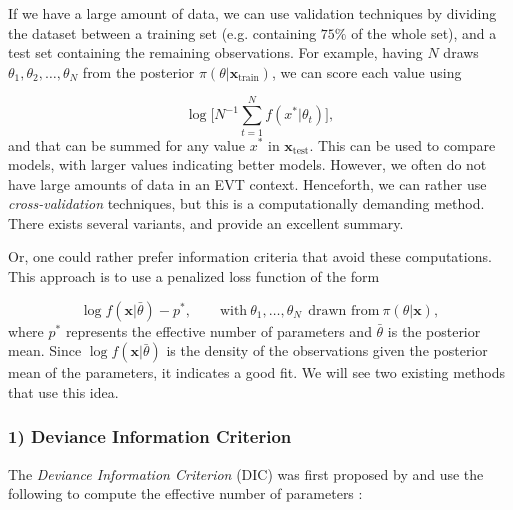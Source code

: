 If we have a large amount of data, we can use validation techniques by dividing the dataset between a training set (e.g. containing $75\%$ of the whole set), and a test set containing the remaining observations.
For example, having $N$ draws $\theta_1,\theta_2,\dots,\theta_N$ from the posterior $\pi(\theta|\boldsymbol{x}_{\text{train}})$, we can score each value using 

\begin{equation*}
\log\bigg[N^{-1}\sum_{t=1}^N f(x^*|\theta_t)\bigg],
\end{equation*}
and that can be summed for any value $x^*$ in $\boldsymbol{x}_{\text{test}}$. This can be used to compare models, with larger values indicating better models.
However, we often do not have large amounts of data in an EVT context. Henceforth, we can rather use \emph{cross-validation} techniques, but this is a computationally demanding method. There exists several variants, and
\citet{Vehtari_practical_2016} provide an excellent summary.

Or, one could rather prefer information criteria that avoid these computations. This approach is to use a penalized loss function of the form

\begin{equation}\label{penbay}
\log f(\boldsymbol{x}|\bar{\theta})-p^*, \qquad \text{with} \ \theta_1,\dots,\theta_N \ \ \text{drawn from} \ \pi(\theta|\boldsymbol{x}),
\end{equation}
where $p^*$ represents the effective number of parameters and $\bar{\theta}$ is the posterior mean. Since $\log f(\boldsymbol{x}|\bar{\theta})$ is the density of the observations given the posterior mean of the parameters, it indicates a good fit.  We will see two existing methods that use this idea.

\vspace{-0.3cm}
\subsubsection*{1) Deviance Information Criterion}

The \emph{Deviance Information Criterion}
(DIC) was first proposed by \citet{Spiegelhalter_bayesian_2002} and use the following to compute the effective number of parameters :

